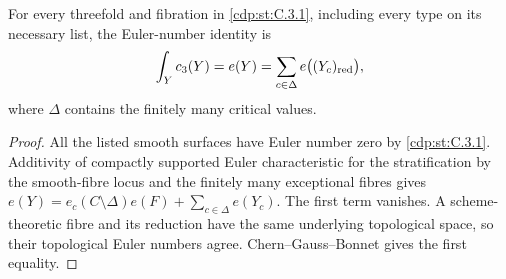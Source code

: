 \begin{proposition}\hypertarget{tag-01FB}{}\label{cdp:st:C.3.5}

For every threefold and fibration in \ref{cdp:st:C.3.1}, including every type on
its necessary list, the Euler-number identity is
\[
\int_Y c_3(Y)=e(Y)=\sum_{c\in\Delta}e\bigl((Y_c)_{\rm red}\bigr),
\]
where $\Delta$ contains the finitely many critical values.
\end{proposition}


\begin{proof}
All the listed smooth surfaces have Euler number zero by \ref{cdp:st:C.3.1}.
Additivity of compactly supported Euler characteristic for the
stratification by the smooth-fibre locus and the finitely many
exceptional fibres gives
$e(Y)=e_c(C\setminus\Delta)e(F)+\sum_{c\in\Delta}e(Y_c)$.
The first term vanishes. A scheme-theoretic fibre and its reduction
have the same underlying topological space, so their topological
Euler numbers agree. Chern--Gauss--Bonnet gives the first equality.

\end{proof}